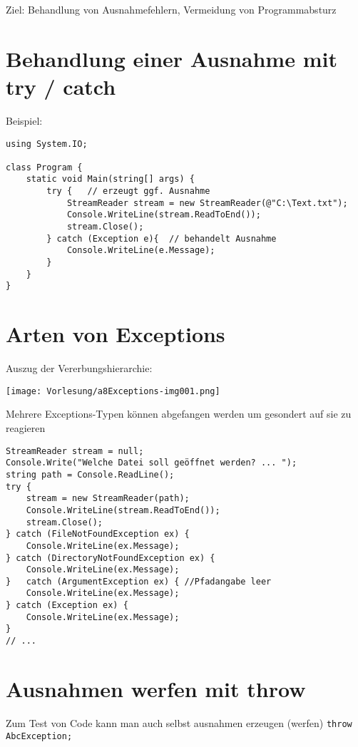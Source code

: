 Ziel: Behandlung von Ausnahmefehlern, Vermeidung von Programmabsturz

\section{Behandlung einer Ausnahme mit try / catch}
Beispiel:
\begin{lstlisting}[language={[Sharp]C}]
using System.IO;

class Program {
	static void Main(string[] args) {
		try {	// erzeugt ggf. Ausnahme
			StreamReader stream = new StreamReader(@"C:\Text.txt");
			Console.WriteLine(stream.ReadToEnd());
			stream.Close();
		} catch (Exception e){	// behandelt Ausnahme
			Console.WriteLine(e.Message); 
		}
	}
}
\end{lstlisting}

\section{Arten von Exceptions}
Auszug der Vererbungshierarchie:

\begin{center}
\texttt{[image: Vorlesung/a8Exceptions-img001.png]}
\end{center}
Mehrere Exceptions-Typen können abgefangen werden um gesondert auf sie zu reagieren

\begin{lstlisting}[language={[Sharp]C}]
StreamReader stream = null;
Console.Write("Welche Datei soll geöffnet werden? ... ");
string path = Console.ReadLine();
try {
	stream = new StreamReader(path);
	Console.WriteLine(stream.ReadToEnd());
	stream.Close();
} catch (FileNotFoundException ex) {
	Console.WriteLine(ex.Message);
} catch (DirectoryNotFoundException ex) {
	Console.WriteLine(ex.Message);
}	catch (ArgumentException ex) { //Pfadangabe leer
	Console.WriteLine(ex.Message);
} catch (Exception ex) {
	Console.WriteLine(ex.Message);
}
// ...
\end{lstlisting}

\section{Ausnahmen werfen mit throw}
Zum Test von Code kann man auch selbst ausnahmen erzeugen (werfen)
\lstinline$throw AbcException;$

